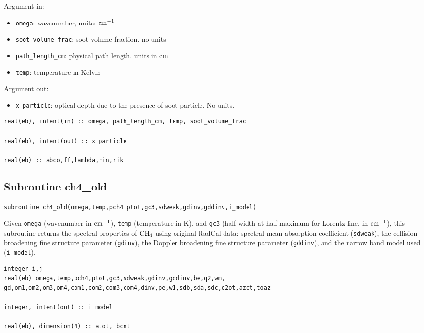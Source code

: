 Argument in:
\begin{itemize}
 \item \verb=omega=: wavenumber, units: $\rm cm^{-1}$
 \item \verb=soot_volume_frac=: soot volume fraction. no units
 \item \verb=path_length_cm=: physical path length. units in $\rm cm$
 \item \verb=temp=: temperature in Kelvin
\end{itemize}

Argument out:
\begin{itemize}
\item \verb=x_particle=: optical depth due to the presence of soot particle. No units.
\end{itemize}

\begin{lstlisting}
real(eb), intent(in) :: omega, path_length_cm, temp, soot_volume_frac

real(eb), intent(out) :: x_particle

real(eb) :: abco,ff,lambda,rin,rik
\end{lstlisting}


\subsection{Subroutine ch4\_old}
\label{sub:ch4_old}

\begin{lstlisting}
subroutine ch4_old(omega,temp,pch4,ptot,gc3,sdweak,gdinv,gddinv,i_model)
\end{lstlisting}
Given \verb=omega= (wavenumber in $\rm cm^{-1}$), \verb=temp= (temperature in K), and \verb=gc3= (half width at half maximum for Lorentz line, in $\rm cm^{-1}$), this subroutine returns the spectral properties of $\rm CH_4$ using original RadCal data: spectral mean absorption coefficient (\verb=sdweak=), the collision broadening fine structure parameter (\verb=gdinv=), the Doppler broadening fine structure parameter (\verb=gddinv=), and the narrow band model used (\verb=i_model=).

\begin{lstlisting}
integer i,j
real(eb) omega,temp,pch4,ptot,gc3,sdweak,gdinv,gddinv,be,q2,wm,
gd,om1,om2,om3,om4,com1,com2,com3,com4,dinv,pe,w1,sdb,sda,sdc,q2ot,azot,toaz

integer, intent(out) :: i_model

real(eb), dimension(4) :: atot, bcnt
\end{lstlisting}


